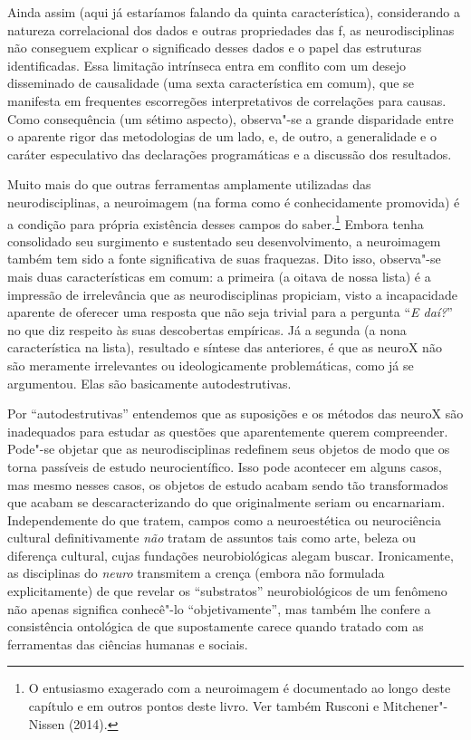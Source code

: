Ainda assim (aqui já estaríamos falando da quinta característica),
considerando a natureza correlacional dos dados e outras propriedades
das f, as neurodisciplinas não conseguem explicar o significado
desses dados e o papel das estruturas identificadas. Essa limitação
intrínseca entra em conflito com um desejo disseminado de causalidade
(uma sexta característica em comum), que se manifesta em frequentes
escorregões interpretativos de correlações para causas. Como
consequência (um sétimo aspecto), observa"-se a grande disparidade entre
o aparente rigor das metodologias de um lado, e, de outro, a
generalidade e o caráter especulativo das declarações programáticas e a
discussão dos resultados.

Muito mais do que outras ferramentas amplamente utilizadas das
neurodisciplinas, a neuroimagem (na forma como é conhecidamente
promovida) é a condição para própria existência desses campos do
saber.\footnote[3]{O entusiasmo exagerado com a neuroimagem é documentado ao longo
deste capítulo e em outros pontos deste livro. Ver também Rusconi e
Mitchener"-Nissen (2014).} Embora tenha consolidado seu surgimento e
sustentado seu desenvolvimento, a neuroimagem também tem sido a fonte
significativa de suas fraquezas. Dito isso, observa"-se mais duas
características em comum: a primeira (a oitava de nossa lista) é a
impressão de irrelevância que as neurodisciplinas propiciam, visto a
incapacidade aparente de oferecer uma resposta que não seja trivial para
a pergunta ``\emph{E daí?}'' no que diz respeito às suas descobertas
empíricas. Já a segunda (a nona característica na lista), resultado e
síntese das anteriores, é que as neuroX não são meramente irrelevantes
ou ideologicamente problemáticas, como já se argumentou. Elas são
basicamente autodestrutivas.

Por ``autodestrutivas'' entendemos que as suposições e os métodos das
neuroX são inadequados para estudar as questões que aparentemente querem
compreender. Pode"-se objetar que as neurodisciplinas redefinem seus
objetos de modo que os torna passíveis de estudo neurocientífico. Isso
pode acontecer em alguns casos, mas mesmo nesses casos, os objetos de
estudo acabam sendo tão transformados que acabam se descaracterizando do
que originalmente seriam ou encarnariam. Independemente do que tratem,
campos como a neuroestética ou neurociência cultural definitivamente
\emph{não} tratam de assuntos tais como arte, beleza ou diferença
cultural, cujas fundações neurobiológicas alegam buscar.
Ironicamente, as disciplinas do \emph{neuro} transmitem a crença (embora
não formulada explicitamente) de que revelar os ``substratos''
neurobiológicos de um fenômeno não apenas significa conhecê"-lo
``objetivamente'', mas também lhe confere a consistência ontológica de
que supostamente carece quando tratado com as ferramentas das ciências
humanas e sociais.

